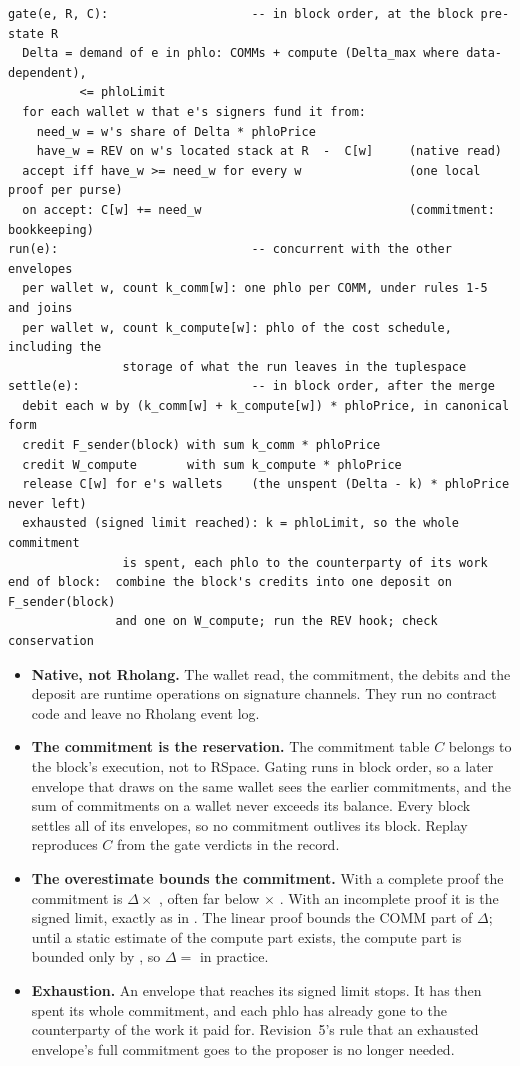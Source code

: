 \documentclass[11pt]{article}
\newcommand{\code}{\path}
\begin{document}
\begin{Verbatim}[fontsize=\footnotesize,frame=single,framesep=6pt]
gate(e, R, C):                    -- in block order, at the block pre-state R
  Delta = demand of e in phlo: COMMs + compute (Delta_max where data-dependent),
          <= phloLimit
  for each wallet w that e's signers fund it from:
    need_w = w's share of Delta * phloPrice
    have_w = REV on w's located stack at R  -  C[w]     (native read)
  accept iff have_w >= need_w for every w               (one local proof per purse)
  on accept: C[w] += need_w                             (commitment: bookkeeping)
run(e):                           -- concurrent with the other envelopes
  per wallet w, count k_comm[w]: one phlo per COMM, under rules 1-5 and joins
  per wallet w, count k_compute[w]: phlo of the cost schedule, including the
                storage of what the run leaves in the tuplespace
settle(e):                        -- in block order, after the merge
  debit each w by (k_comm[w] + k_compute[w]) * phloPrice, in canonical form
  credit F_sender(block) with sum k_comm * phloPrice
  credit W_compute       with sum k_compute * phloPrice
  release C[w] for e's wallets    (the unspent (Delta - k) * phloPrice never left)
  exhausted (signed limit reached): k = phloLimit, so the whole commitment
                is spent, each phlo to the counterparty of its work
end of block:  combine the block's credits into one deposit on F_sender(block)
               and one on W_compute; run the REV hook; check conservation
\end{Verbatim}

\begin{itemize}
\item \textbf{Native, not Rholang.} The wallet read, the commitment, the debits and the deposit are runtime operations on signature channels. They run no contract code and leave no Rholang event log.
\item \textbf{The commitment is the reservation.} The commitment table $C$ belongs to the block's execution, not to RSpace. Gating runs in block order, so a later envelope that draws on the same wallet sees the earlier commitments, and the sum of commitments on a wallet never exceeds its balance. Every block settles all of its envelopes, so no commitment outlives its block. Replay reproduces $C$ from the gate verdicts in the record.
\item \textbf{The overestimate bounds the commitment.} With a complete proof the commitment is $\Delta \times$ \code{phloPrice}, often far below \code{phloLimit} $\times$ \code{phloPrice}. With an incomplete proof it is the signed limit, exactly as in \code{dev}. The linear proof bounds the COMM part of $\Delta$; until a static estimate of the compute part exists, the compute part is bounded only by \code{phloLimit}, so $\Delta = $ \code{phloLimit} in practice.
\item \textbf{Exhaustion.} An envelope that reaches its signed limit stops. It has then spent its whole commitment, and each phlo has already gone to the counterparty of the work it paid for. Revision~5's rule that an exhausted envelope's full commitment goes to the proposer is no longer needed.
\end{itemize}
\end{document}
